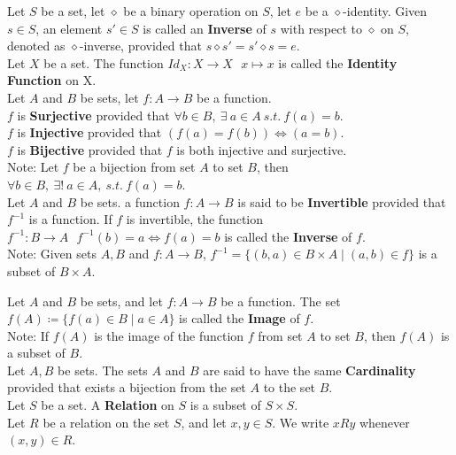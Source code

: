\documentclass[11pt]{article}
\newcommand{\note}{\color{gray}Note: \color{black}}
\begin{document}
		\noindent Let $S$ be a set, let $\diamond$ be a binary operation on $S$, let $e$ be a $\diamond$-identity. Given $s \in S$, an element $s' \in S$ is called an \textbf{Inverse} of $s$ with respect to $\diamond$ on $S$, denoted as $\diamond$-inverse, provided that $s \diamond s' = s' \diamond s = e$.\\
		
		\noindent Let $X$ be a set. The function $Id_X :X \to X \ \ \ x \mapsto x$ is called the \textbf{Identity Function} on X.\\

		\noindent Let $A$ and $B$ be sets, let $f:A \to B$ be a function. \\ $f$ is \textbf{Surjective} provided that $\forall b \in B, \ \exists \ a \in A \ s.t. \  f(a)=b$.\\ $f$ is \textbf{Injective} provided that $(f(a)=f(b)) \iff (a=b)$.\\ $f$ is \textbf{Bijective} provided that $f$ is both injective and surjective. \\
		\note Let $f$ be a bijection from set $A$ to set $B$, then $ \forall b \in B, \ \exists! \ a \in A, \ s.t. \ f(a)=b$.\\
	
		\noindent Let $A$ and $B$ be sets. a function $f:A \to B$ is said to be \textbf{Invertible} provided that $f^{-1}$ is a function. If $f$ is invertible, the function $f^{-1}:B \to A \ \ \ f^{-1}(b)=a \iff f(a)=b$ is called the \textbf{Inverse} of $f$.\\
		\note Given sets $A,B$ and $f:A \to B$, $f^{-1}=\{ (b,a) \in B \times A \mid (a,b) \in f \} $ is a subset of $B \times A$.\\
\clearpage
	
		\noindent Let $A$ and $B$ be sets, and let $f:A \to B$ be a function. The set $f(A) \coloneqq \{f(a)\in B \mid a \in A\}$ is called the \textbf{Image} of $f$.\\
		\note If $f(A)$ is the image of the function $f$ from set $A$ to set $B$, then $f(A)$ is a subset of $B$.\\
		
		\noindent Let $A,B$ be sets. The sets $A$ and $B$ are said to have the same \textbf{Cardinality} provided that exists a bijection from the set $A$ to the set $B$.\\

		\noindent Let $S$ be a set. A \textbf{Relation} on $S$ is a subset of $S \times S$.\\ Let $R$ be a relation on the set $S$, and let $x,y \in S$. We write $xRy$ whenever $(x,y) \in R$.\\
\end{document}
